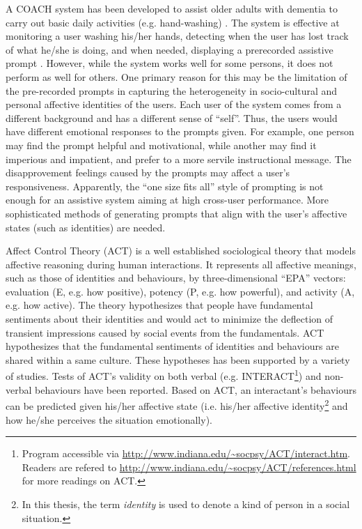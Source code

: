 A COACH system has been developed to assist older adults with dementia to carry out basic daily activities (e.g. hand-washing) \cite{boger2005decision, mihailidis2008coach}. The system is effective at monitoring a user washing his/her hands, detecting when the user has lost track of what he/she is doing, and when needed, displaying a prerecorded assistive prompt \cite{mihailidis2008coach}. However, while the system works well for some persons, it does not perform as well for others. One primary reason for this may be the limitation of the pre-recorded prompts in capturing the heterogeneity in socio-cultural and personal affective identities of the users. Each user of the system comes from a different background and has a different sense of ``self''. Thus, the users would have different emotional responses to the prompts given. For example, one person may find the prompt helpful and motivational, while another may find it imperious and impatient, and prefer to a more servile instructional message. The disapprovement feelings caused by the prompts may affect a user's responsiveness. Apparently, the ``one size fits all'' style of prompting is not enough for an assistive system aiming at high cross-user performance. More sophisticated methods of generating prompts that align with the user's affective states (such as identities) are needed.

Affect Control Theory (ACT) \cite{robinson2006affect} is a well established sociological theory that models affective reasoning during human interactions. It represents all affective meanings, such as those of identities and behaviours, by three-dimensional ``EPA'' vectors: evaluation (E, e.g. how positive), potency (P, e.g. how powerful), and activity (A, e.g. how active). The theory hypothesizes that people have fundamental sentiments about their identities and would act to minimize the deflection of transient impressions caused by social events from the fundamentals. ACT hypothesizes that the fundamental sentiments of identities and behaviours are shared within a same culture. These hypotheses has been supported by a variety of studies. Tests of ACT's validity on both verbal (e.g. INTERACT\footnote{Program accessible via \url{http://www.indiana.edu/~socpsy/ACT/interact.htm}. Readers are refered to \url{http://www.indiana.edu/~socpsy/ACT/references.html} for more readings on ACT.}) and non-verbal behaviours \cite{schroder2013culture} have been reported. Based on ACT, an interactant's behaviours can be predicted given his/her affective state (i.e. his/her affective identity\footnote{In this thesis, the term \textit{identity} is used to denote a kind of person in a social situation.} and how he/she perceives the situation emotionally).


